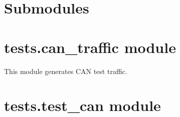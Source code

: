 \documentclass[letterpaper,10pt,english]{sphinxmanual}
\begin{document}
\section{Submodules}
\label{tests:submodules}

\section{tests.can\_traffic module}
\label{tests:tests-can-traffic-module}\label{tests:module-tests.can_traffic}

\begin{fulllineitems}
\label{tests:tests.can_traffic.main}
This module generates CAN test traffic.

\end{fulllineitems}



\section{tests.test\_can module}
\label{tests:module-tests.test_can}\label{tests:tests-test-can-module}
\end{document}

